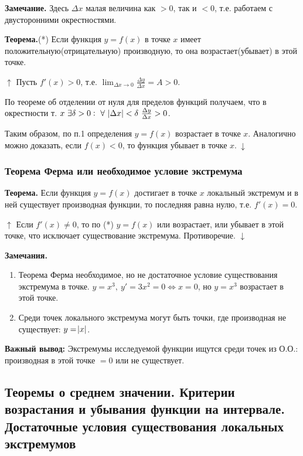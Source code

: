 \documentclass{article}
\begin{document}
\textbf{Замечание.} Здесь \(\Delta x\) малая величина как \(>0\), так и \(<0\), т.е. работаем с двусторонними окрестностями.

\textbf{Теорема.}(*) Если функция \(y = f(x)\) в точке \(x\) имеет положительную(отрицательную) производную, то она возрастает(убывает) в этой точке.

\(\uparrow\) Пусть \(f'(x) > 0\), т.е. \(\lim_{\Delta x \to 0} \frac{\Delta y}{\Delta x} = A > 0\).

По теореме об отделении от нуля для пределов функций получаем, что в окрестности т. \(x\ \exists \delta > 0:\ \forall\ \abs{\Delta x} < \delta\ \frac{\Delta y}{\Delta x} > 0\).

Таким образом, по п.1 определения \(y = f(x)\) возрастает в точке \(x\). Аналогично можно доказать, если \(f(x) < 0\), то функция убывает в точке \(x.\ \downarrow\)

\subsubsection{Теорема Ферма или необходимое условие экстремума}

\textbf{Теорема.} Если функция \(y = f(x)\) достигает в точке \(x\) локальный экстремум и в ней существует производная функции, то последняя равна нулю, т.е. \(f'(x) = 0\).

\(\uparrow\) Если \(f'(x) \neq 0\), то по (*) \(y = f(x)\) или возрастает, или убывает в этой точке, что исключает существование экстремума. Противоречие. \(\downarrow\)

\textbf{Замечания.}
\begin{enumerate}
    \item Теорема Ферма необходимое, но не достаточное условие существования экстремума в точке. \(y = x^3,\ y' = 3x^2 = 0 \Leftrightarrow x = 0\), но \(y = x^3\) возрастает в этой точке.
    \item Среди точек локального экстремума могут быть точки, где производная не существует: \(y = \abs{x}\).
\end{enumerate}

\textbf{Важный вывод:} Экстремумы исследуемой функции ищутся среди точек из О.О.: производная в этой точке \(= 0\) или не существует.

\subsection{Теоремы о среднем значении. Критерии возрастания и убывания функции на интервале. Достаточные условия существования локальных экстремумов}
\end{document}
